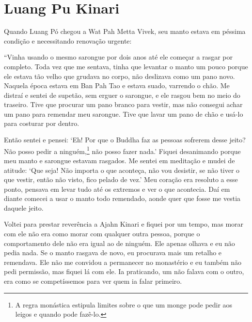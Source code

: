 \chapter{Luang Pu Kinari}

Quando Luang Pó chegou a Wat Pah Metta Vivek, seu manto estava em
péssima condição e necessitando renovação urgente:

``Vinha usando o mesmo sarongue por dois anos até ele começar a rasgar
por completo. Toda vez que me sentava, tinha que levantar o manto um
pouco porque ele estava tão velho que grudava no corpo, não deslizava
como um pano novo. Naquela época estava em Ban Pah Tao e estava suado,
varrendo o chão. Me distraí e sentei de supetão, sem erguer o sarongue,
e ele rasgou bem no meio do traseiro. Tive que procurar um pano branco
para vestir, mas não consegui achar um pano para remendar meu sarongue.
Tive que lavar um pano de chão e usá-lo para costurar por dentro.

Então sentei e pensei: `Eh! Por que o Buddha faz as pessoas sofrerem
desse jeito? Não posso pedir a ninguém,\footnote{A regra monástica
  estipula limites sobre o que um monge pode pedir aos leigos e quando
  pode fazê-lo.} não posso fazer nada.' Fiquei desanimando porque meu
manto e sarongue estavam rasgados. Me sentei em meditação e mudei de
atitude: `Que seja! Não importa o que aconteça, não vou desistir, se não
tiver o que vestir, então não visto, fico pelado de vez.' Meu coração
era resoluto a esse ponto, pensava em levar tudo até os extremos e ver o
que acontecia. Daí em diante comecei a usar o manto todo remendado,
aonde quer que fosse me vestia daquele jeito.

Voltei para prestar reverência a Ajahn Kinari e fiquei por um tempo, mas
morar com ele não era como morar com qualquer outra pessoa, porque o
comportamento dele não era igual ao de ninguém. Ele apenas olhava e eu
não pedia nada. Se o manto rasgava de novo, eu procurava mais um retalho
e remendava. Ele não me convidou a permanecer no monastério e eu também
não pedi permissão, mas fiquei lá com ele. Ia praticando, um não falava
com o outro, era como se competíssemos para ver quem ia falar primeiro.

